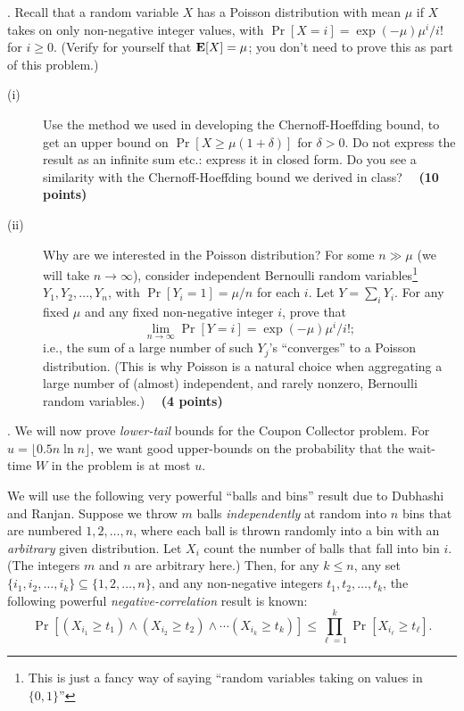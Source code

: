 \documentclass{article}[11pt]
\begin{document}
\medskip {}. 
Recall that a random variable $X$ has a Poisson distribution
with mean $\mu$ if $X$ takes on only non-negative integer
values, with $\Pr[X = i] = \exp(-\mu) \mu^i / i!$ for
$i \geq 0$. (Verify for yourself that $\textbf{E}[X] = \mu$; you don't
need to prove this as part of this problem.) 
\begin{description}
\item[(i)] Use the method
we used in developing the Chernoff-Hoeffding bound, to get an upper bound on
$\Pr[X \geq \mu(1 + \delta)]$ for $\delta > 0$. Do not express the
result as an infinite sum etc.: express it in closed form. Do you see a
similarity with the Chernoff-Hoeffding bound we derived in class? ~~\textbf{(10 points)}
\item [(ii)] Why are we interested in the Poisson distribution? For some $n \gg \mu$ (we will take 
$n \rightarrow \infty$), consider independent Bernoulli random variables\footnote{This is just a
fancy way of saying ``random variables taking on values in $\{0,1\}$''} $Y_1, Y_2, \ldots, Y_n$, with $\Pr[Y_i = 1] = \mu/n$ for each $i$. Let $Y = \sum_i Y_i$. For any fixed $\mu$ and any fixed non-negative integer $i$, prove that 
\[ \lim_{n \rightarrow \infty} \Pr[Y = i] = \exp(-\mu) \mu^i / i!; \]
i.e., the sum of a large number of such $Y_j$'s ``converges'' to a Poisson distribution. (This is why Poisson is a natural choice when aggregating a large number of (almost) independent, and rarely nonzero, Bernoulli random variables.) ~~\textbf{(4 points)}
\end{description}

\medskip {}. We will now prove \emph{lower-tail} bounds for the Coupon Collector problem. For $u = \lfloor 0.5 n \ln n \rfloor$, we want good upper-bounds on the probability that the wait-time $W$ in the problem is at most $u$. 

We will use the following very powerful ``balls and bins'' result due to Dubhashi and Ranjan. Suppose we throw $m$ balls \emph{independently} at random into $n$ bins that are numbered $1, 2, \ldots, n$, where each ball is thrown randomly into a bin with an \emph{arbitrary} given distribution. Let $X_i$ count the number of balls that fall into bin $i$. (The integers $m$ and $n$ are arbitrary here.) Then, for any $k \leq n$, any set $\{i_1, i_2, \ldots, i_k\} \subseteq \{1, 2, \ldots, n\}$, and any non-negative integers $t_1, t_2, \ldots, t_k$, the following powerful \emph{negative-correlation} result is known:
\[ \Pr[(X_{i_1} \geq t_1) \wedge (X_{i_2} \geq t_2) \wedge \cdots (X_{i_k} \geq t_k)] \leq
\prod_{\ell = 1}^k \Pr[X_{i_{\ell}} \geq t_{\ell}]. \] 
\end{document}
